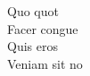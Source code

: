 \documentclass[12pt,a4paper]{letter}
\begin{document}
\begin{letter}{Quo quot \\ Facer congue \\ Quis eros \\ Veniam sit no}
%    
%    
%    
%    
\end{letter}
\end{document}
